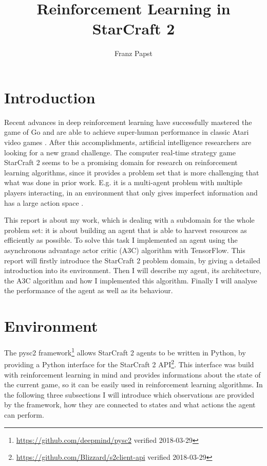 \documentclass{article}
\title{Reinforcement Learning in StarCraft 2}
\author{Franz Papst}
\begin{document}
\maketitle

\section{Introduction}
Recent advances in deep reinforcement learning have successfully mastered the 
game of Go \cite{Silver2016} and are able to achieve super-human performance in 
classic Atari video games \cite{Mnih2013}. After this accomplishments, 
artificial intelligence researchers are looking for a new grand challenge. The 
computer real-time strategy game StarCraft 2 seems to be a promising domain for 
research on reinforcement learning algorithms, since it provides a problem set 
that is more challenging that what was done in prior work. E.g. it is a 
multi-agent problem with multiple players interacting, in an environment that 
only gives imperfect information and has a large action space 
\cite{Vinyals2017}.

This report is about my work, which is dealing with a subdomain for the whole 
problem set: it is about building an agent that is able to harvest resources as 
efficiently as possible. To solve this task I implemented an agent using the 
asynchronous advantage actor critic (A3C) algorithm \cite{Mnih2016} with 
TensorFlow. This report will firstly introduce the StarCraft 2 problem domain, 
by giving a detailed introduction into its environment. Then I will describe my 
agent, its architecture, the A3C algorithm and how I implemented this 
algorithm. Finally I will analyse the performance of the agent as well as its 
behaviour.



\section{Environment}
The pysc2 framework\footnote{\url{https://github.com/deepmind/pysc2} verified 
2018-03-29} allows StarCraft 2 agents to be written in Python, by providing a 
Python interface for the StarCraft 2 
API\footnote{\url{https://github.com/Blizzard/s2client-api} verified 
2018-03-29}. This interface was build with reinforcement learning in mind and 
provides informations about the state of the current game, so it can be easily 
used in reinforcement learning algorithms. In the following three subsections I 
will introduce which observations are provided by the framework, how they are 
connected to states and what actions the agent can perform.
\end{document}
